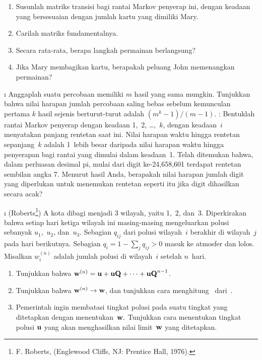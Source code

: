 \begin{LJSItem}
\begin{enumerate}
\item Susunlah matriks transisi bagi rantai Markov penyerap ini, dengan keadaan
yang bersesuaian dengan jumlah kartu yang dimiliki Mary.

\item Carilah matriks fundamentalnya.

\item Secara rata-rata, berapa langkah permainan berlangsung?

\item Jika Mary membagikan kartu, berapakah peluang John memenangkan permainan?
\end{enumerate}

\i\label{exer 11.2.19} Anggaplah suatu percobaan memiliki $m$ hasil yang sama
mungkin. Tunjukkan bahwa nilai harapan jumlah percobaan saling bebas sebelum
kemunculan pertama $k$ hasil sejenis berturut-turut adalah
$(m^k - 1)/(m - 1)$. : Bentuklah rantai Markov penyerap dengan
keadaan 1,~2, \ldots,~$k$, dengan keadaan~$i$ menyatakan panjang rentetan saat
ini. Nilai harapan waktu hingga rentetan sepanjang~$k$ adalah 1~lebih besar
daripada nilai harapan waktu hingga penyerapan bagi rantai yang dimulai dalam
keadaan~1. Telah ditemukan bahwa, dalam perluasan desimal pi, mulai dari digit
ke-24{,}658{,}601 terdapat rentetan sembilan angka 7. Menurut hasil Anda,
berapakah nilai harapan jumlah digit yang diperlukan untuk menemukan rentetan
seperti itu jika digit dihasilkan secara acak?

\i\label{exer 11.2.20} (Roberts\footnote{F. Roberts,  (Englewood Cliffs, NJ: Prentice Hall, 1976).}) A
kota dibagi menjadi 3 wilayah, yaitu 1,~2, dan~3. Diperkirakan bahwa setiap hari
ketiga wilayah ini masing-masing mengeluarkan polusi sebanyak $u_1$,~$u_2$,
dan~$u_3$. Sebagian $q_{ij}$ dari polusi wilayah~$i$ berakhir di wilayah~$j$
pada hari berikutnya. Sebagian $q_i = 1 - \sum_j q_{ij} > 0$ masuk ke atmosfer
dan lolos. Misalkan $w_i^{(n)}$ adalah jumlah polusi di wilayah~$i$ setelah
$n$~hari.
\begin{enumerate}

\item Tunjukkan bahwa ${\mbox{\bf w}\/}^{(n)} = {\mbox{\bf u}\/} + {\mbox{\bf u}\/} {\mbox{\bf Q}\/} +\cdots +
{\mbox{\bf u}\/}{\mbox{\bf Q}\/}^{n - 1}$.

\item Tunjukkan bahwa ${\mbox{\bf w}\/}^{(n)} \to {\mbox{\bf w}\/}$, dan tunjukkan cara menghitung
~dari~.
 
\item Pemerintah ingin membatasi tingkat polusi pada suatu tingkat yang
ditetapkan dengan menentukan~${\mbox{\bf w}\/}.$ Tunjukkan cara menentukan tingkat polusi
${\mbox{\bf u}\/}$ yang akan menghasilkan nilai limit~${\mbox{\bf w}\/}$ yang ditetapkan.
\end{enumerate}


\end{LJSItem}
